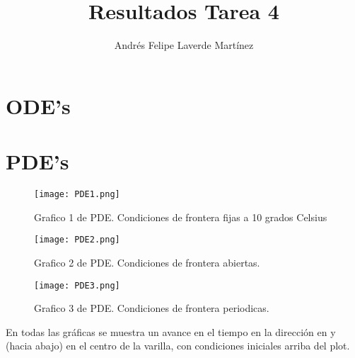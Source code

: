 \documentclass{article}
\begin{document}
\title{Resultados Tarea 4}
\author{Andrés Felipe Laverde Martínez}
\maketitle
\section{ODE's}

\begin{figure}

\end{figure}

\section{PDE's}

\begin{figure}[htb]
	\texttt{[image: PDE1.png]}
		\caption{Grafico 1 de PDE. Condiciones de frontera fijas a 10 grados Celsius}
\end{figure}

\begin{figure}[htb]
	\texttt{[image: PDE2.png]}
		\caption{Grafico 2 de PDE. Condiciones de frontera abiertas.}
\end{figure}

\begin{figure}[htb]
	\texttt{[image: PDE3.png]}
		\caption{Grafico 3 de PDE. Condiciones de frontera periodicas.}
\end{figure}
En todas las gráficas se muestra un avance en el tiempo en la dirección en y (hacia abajo) en el centro de la varilla, con condiciones iniciales arriba del plot.
\end{document}

